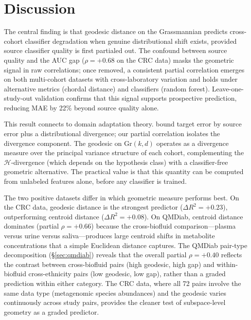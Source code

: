 \documentclass[11pt]{article}
\begin{document}
\section{Discussion}
\label{sec:discussion}

The central finding is that geodesic distance on the Grassmannian predicts cross-cohort classifier degradation when genuine distributional shift exists, provided source classifier quality is first partialed out. The confound between source quality and the AUC gap ($\rho = +0.68$ on the CRC data) masks the geometric signal in raw correlations; once removed, a consistent partial correlation emerges on both multi-cohort datasets with cross-laboratory variation and holds under alternative metrics (chordal distance) and classifiers (random forest). Leave-one-study-out validation confirms that this signal supports prospective prediction, reducing MAE by 22\% beyond source quality alone.

This result connects to domain adaptation theory. \citet{bendavid2010theory} bound target error by source error plus a distributional divergence; our partial correlation isolates the divergence component. The geodesic on $\mathrm{Gr}(k, d)$ operates as a divergence measure over the principal variance structure of each cohort, complementing the $\mathcal{H}$-divergence (which depends on the hypothesis class) with a classifier-free geometric alternative. The practical value is that this quantity can be computed from unlabeled features alone, before any classifier is trained.

The two positive datasets differ in which geometric measure performs best. On the CRC data, geodesic distance is the strongest predictor ($\Delta R^2 = +0.23$), outperforming centroid distance ($\Delta R^2 = +0.08$). On QMDiab, centroid distance dominates (partial $\rho = +0.66$) because the cross-biofluid comparison---plasma versus urine versus saliva---produces large centroid shifts in metabolite concentrations that a simple Euclidean distance captures. The QMDiab pair-type decomposition (\S\ref{sec:qmdiab}) reveals that the overall partial $\rho = +0.40$ reflects the contrast between cross-biofluid pairs (high geodesic, high gap) and within-biofluid cross-ethnicity pairs (low geodesic, low gap), rather than a graded prediction within either category. The CRC data, where all 72 pairs involve the same data type (metagenomic species abundances) and the geodesic varies continuously across study pairs, provides the cleaner test of subspace-level geometry as a graded predictor.
\end{document}

